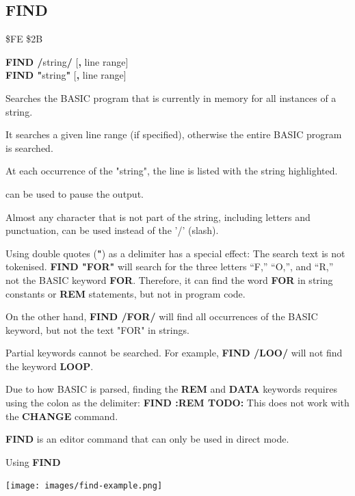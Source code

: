 \subsection{FIND}
\begin{description}[leftmargin=2cm,style=nextline]
\item [Token:]    \$FE \$2B

\item [Format:]   {\bf FIND /}string{\bf/} [{\bf,} line range] \\
		            {\bf FIND "}string{\bf"} [{\bf,} line range]

\item [Usage:]    Searches the BASIC program that is currently in memory for all instances of a string.

                  It searches a given line range (if specified), otherwise the entire BASIC program is searched.

                  At each occurrence of the "string", the line is listed with the string highlighted.

                   can be used to pause the output.

\item [Remarks:]  Almost any character that is not part of the string, including letters and punctuation, can be used instead of the '/' (slash).

                  Using double quotes ({\bf "}) as a delimiter has a special effect: The search text is not tokenised. {\bf FIND "FOR"} will search for the three letters ``F,'' ``O,'', and ``R,'' not the BASIC keyword {\bf FOR}. Therefore, it can find the word {\bf FOR} in string constants or {\bf REM} statements, but not in program code.

                  On the other hand, {\bf FIND /FOR/} will find all occurrences of the BASIC keyword, but not the text "FOR" in strings.

                  Partial keywords cannot be searched. For example, {\bf FIND /LOO/} will not find the keyword {\bf LOOP}.

                  Due to how BASIC is parsed, finding the {\bf REM} and {\bf DATA} keywords requires using the colon as the delimiter: {\bf FIND :REM TODO:} This does not work with the {\bf CHANGE} command.

                  {\bf FIND} is an editor command that can only be used in direct mode.

\item [Example:]  Using {\bf FIND}

\item \begin{center}\texttt{[image: images/find-example.png]}\end{center}
\end{description}

